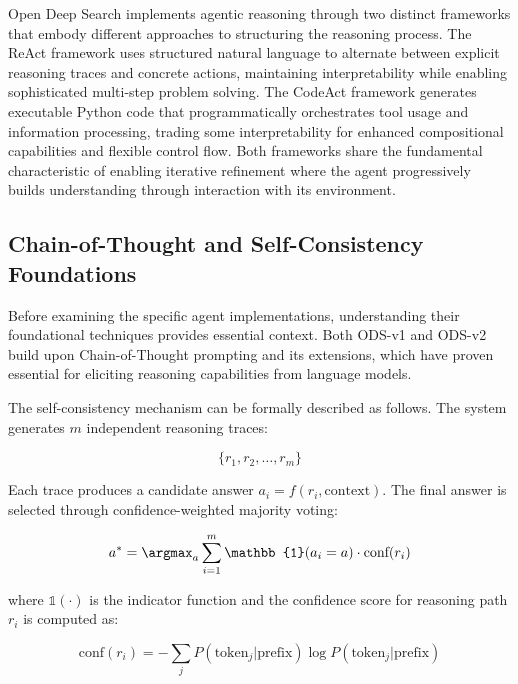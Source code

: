 Open Deep Search implements agentic reasoning through two distinct frameworks that embody different approaches to structuring the reasoning process. The ReAct framework uses structured natural language to alternate between explicit reasoning traces and concrete actions, maintaining interpretability while enabling sophisticated multi-step problem solving. The CodeAct framework generates executable Python code that programmatically orchestrates tool usage and information processing, trading some interpretability for enhanced compositional capabilities and flexible control flow. Both frameworks share the fundamental characteristic of enabling iterative refinement where the agent progressively builds understanding through interaction with its environment.

\subsection{Chain-of-Thought and Self-Consistency Foundations}

Before examining the specific agent implementations, understanding their foundational techniques provides essential context. Both ODS-v1 and ODS-v2 build upon Chain-of-Thought prompting and its extensions, which have proven essential for eliciting reasoning capabilities from language models.

The self-consistency mechanism can be formally described as follows. The system generates $m$ independent reasoning traces:

\begin{equation}
\{r_1, r_2, \ldots, r_m\}
\label{eq:reasoning_traces}
\end{equation}

Each trace produces a candidate answer $a_i = f(r_i, \text{context})$. The final answer is selected through confidence-weighted majority voting:

\begin{equation}
a^* = \argmax_{a} \sum_{i=1}^{m} \mathbb{1}(a_i = a) \cdot \text{conf}(r_i)
\label{eq:majority_voting}
\end{equation}

where $\mathbb{1}(\cdot)$ is the indicator function and the confidence score for reasoning path $r_i$ is computed as:

\begin{equation}
\text{conf}(r_i) = -\sum_{j} P(\text{token}_j | \text{prefix}) \log P(\text{token}_j | \text{prefix})
\label{eq:confidence}
\end{equation}

